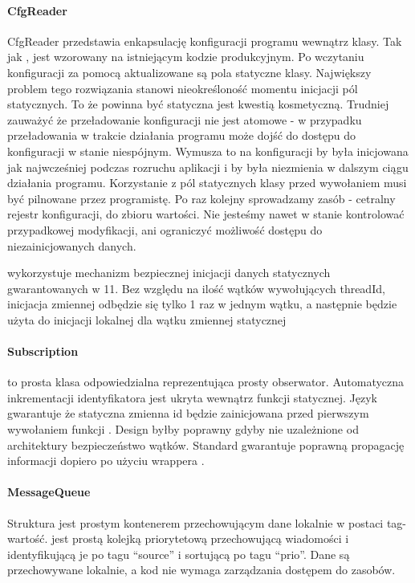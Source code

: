\paragraph{CfgReader}
CfgReader przedstawia enkapsulację konfiguracji programu wewnątrz klasy.
Tak jak ,  jest wzorowany na istniejącym kodzie produkcyjnym. Po wczytaniu konfiguracji za pomocą  aktualizowane są pola statyczne klasy. Największy problem tego rozwiązania stanowi nieokreśloność momentu inicjacji pól statycznych. To że  powinna być statyczna jest kwestią kosmetyczną. Trudniej zauważyć że przeładowanie konfiguracji nie jest atomowe - w przypadku przeładowania w trakcie działania programu może dojść do dostępu do konfiguracji w stanie niespójnym. Wymusza to na konfiguracji by była inicjowana jak najwcześniej podczas rozruchu aplikacji i by była niezmienia w dalszym ciągu działania programu. Korzystanie z pól statycznych klasy przed wywołaniem  musi być pilnowane przez programistę. Po raz kolejny sprowadzamy zasób - cetralny rejestr konfiguracji, do zbioru wartości. Nie jesteśmy nawet w stanie kontrolować przypadkowej modyfikacji, ani ograniczyć możliwość dostępu do niezainicjowanych danych.

 wykorzystuje mechanizm bezpiecznej inicjacji danych statycznych gwarantowanych w \Cpp{}11. Bez względu na ilość wątków wywołujących threadId, inicjacja zmiennej  odbędzie się tylko 1 raz w jednym wątku, a następnie będzie użyta do inicjacji lokalnej dla wątku zmiennej statycznej 

\paragraph{Subscription}
 to prosta klasa odpowiedzialna reprezentująca prosty obserwator. Automatyczna inkrementacji identyfikatora jest ukryta wewnątrz funkcji statycznej. Język gwarantuje że statyczna zmienna id będzie zainicjowana przed pierwszym wywołaniem funkcji . Design byłby poprawny gdyby nie uzależnione od architektury bezpieczeństwo wątków. Standard gwarantuje poprawną propagację informacji dopiero po użyciu wrappera .

\paragraph{MessageQueue}
Struktura  jest prostym kontenerem przechowującym dane lokalnie w postaci tag-wartość.
 jest prostą kolejką priorytetową przechowującą wiadomości i identyfikującą je po tagu ``source'' i sortującą po tagu ``prio''. Dane są przechowywane lokalnie, a kod nie wymaga zarządzania dostępem do zasobów.

